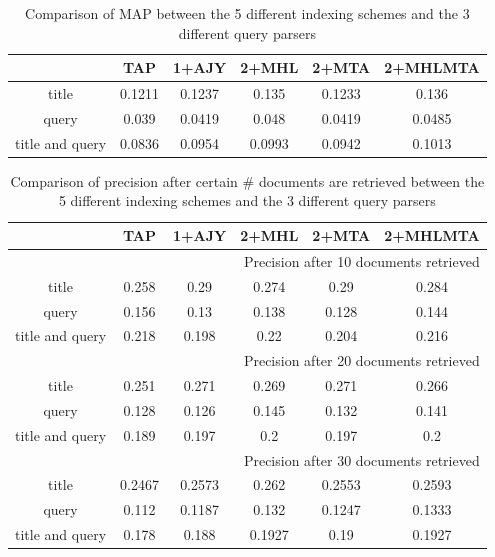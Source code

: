 \vspace{-0.25cm}
\begin{table}[h!]
\caption{Comparison of MAP between the 5 different indexing schemes and the 3 different query parsers}
\vspace{-0.1cm}
\centering
	\begin{tabular}{cccccc} 
\hline 
                & TAP & 1+AJY & 2+MHL & 2+MTA & 2+MHLMTA \\ \hline
title           & 0.1211     & 0.1237     & 0.135      & 0.1233     & 0.136      \\
query           & 0.039      & 0.0419     & 0.048      & 0.0419     & 0.0485     \\
title and query & 0.0836     & 0.0954     & 0.0993     & 0.0942     & 0.1013     \\ \hline
     \end{tabular}
\end{table}
\vspace{-0.6cm}
\begin{table}[h!]
\centering
\caption{Comparison of precision after certain \# documents are retrieved  between the 5 different indexing schemes and the 3 different query parsers}
\vspace{-0.1cm}
\label{my-label}
\begin{tabular}{cccccc}
\hline
                & TAP & 1+AJY & 2+MHL & 2+MTA & 2+MHLMTA \\ \hline
\multicolumn{6}{r}{Precision after 10 documents retrieved}                       \\ \hline
title           & 0.258      & 0.29       & 0.274      & 0.29       & 0.284      \\
query           & 0.156      & 0.13       & 0.138      & 0.128      & 0.144      \\
title and query & 0.218      & 0.198      & 0.22       & 0.204      & 0.216      \\ \hline
\multicolumn{6}{r}{Precision after 20 documents retrieved}                     \\ \hline
title           & 0.251      & 0.271      & 0.269      & 0.271      & 0.266      \\
query           & 0.128      & 0.126      & 0.145      & 0.132      & 0.141      \\
title and query & 0.189      & 0.197      & 0.2        & 0.197      & 0.2        \\ \hline
\multicolumn{6}{r}{Precision after 30 documents retrieved}                     \\ \hline
title           & 0.2467     & 0.2573     & 0.262      & 0.2553     & 0.2593     \\
query           & 0.112      & 0.1187     & 0.132      & 0.1247     & 0.1333     \\
title and query & 0.178      & 0.188      & 0.1927     & 0.19       & 0.1927     \\ \hline
\end{tabular}
\end{table}
